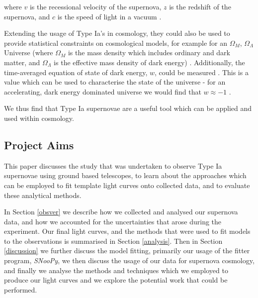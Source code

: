 \documentclass[twocolumn]{revtex4}
\begin{document}
where $v$ is the recessional velocity of the supernova, $z$ is the redshift of the supernova, and $c$ is the speed of light in a vacuum \cite{mod_ast}.

Extending the usage of Type Ia's in cosmology, they could also be used to provide statistical constraints on cosmological models, for example for an $\Omega_M$, $\Omega_{\Lambda}$ Universe (where $\Omega_M$ is the mass density which includes ordinary and dark matter, and $\Omega_{\Lambda}$ is the effective mass density of dark energy) \cite{mod_ast, exp_uni_sn}. Additionally, the time-averaged equation of state of dark energy, $w$, could be measured \cite{sn_consts}. This is a value which can be used to characterise the state of the universe - for an accelerating, dark energy dominated universe we would find that $w \approx -1$ \cite{longair}. 

We thus find that Type Ia supernovae are a useful tool which can be applied and used within cosmology.

\vspace{-3ex}
\subsection{Project Aims}
\vspace{-2ex}
This paper discusses the study that was undertaken to observe Type Ia supernovae using ground based telescopes, to learn about the approaches which can be employed to fit template light curves onto collected data, and to evaluate these analytical methods.

In Section \ref{obsver} we describe how we collected and analysed our supernova data, and how we accounted for the uncertainties that arose during the experiment. Our final light curves, and the methods that were used to fit models to the observations is summarised in Section \ref{analysis}. Then in Section \ref{discussion} we further discuss the model fitting, primarily our usage of the fitter program, \textit{SNooPy}, we then discuss the usage of our data for supernova cosmology, and finally we analyse the methods and techniques which we employed to produce our light curves and we explore the potential work that could be performed.


\end{document}
